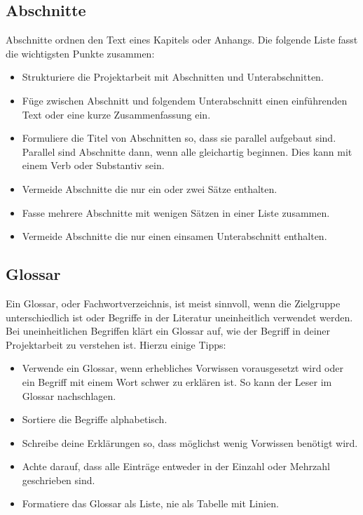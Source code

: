 \documentclass[a4paper,titlepage=true,twoside]{scrartcl}
\newcommand{\gquote}[1]{\glqq #1\grqq}
\begin{document}
\subsection{Abschnitte}
Abschnitte ordnen den Text eines Kapitels oder Anhangs. Die folgende Liste fasst
die wichtigsten Punkte zusammen:

\begin{itemize}
 \item Strukturiere die Projektarbeit mit Abschnitten und Unterabschnitten.
 \item Füge zwischen Abschnitt und folgendem Unterabschnitt einen einführenden
 Text oder eine kurze Zusammenfassung ein.
 \item Formuliere die Titel von Abschnitten so, dass sie \gquote{parallel} aufgebaut sind.
 Parallel sind Abschnitte dann, wenn alle gleichartig beginnen. Dies kann mit
  einem Verb oder Substantiv sein.
 \item Vermeide Abschnitte die nur ein oder zwei Sätze enthalten.
 \item Fasse mehrere Abschnitte mit wenigen Sätzen in einer Liste zusammen.
 \item Vermeide Abschnitte die nur einen einsamen Unterabschnitt enthalten.
\end{itemize}

\subsection{Glossar}
Ein Glossar, oder Fachwortverzeichnis, ist meist sinnvoll, wenn die Zielgruppe
unterschiedlich ist oder Begriffe in der Literatur uneinheitlich verwendet
werden. Bei uneinheitlichen Begriffen klärt ein Glossar auf, wie der Begriff
in deiner Projektarbeit zu verstehen ist. Hierzu einige Tipps:

\begin{itemize}
 \item Verwende ein Glossar, wenn erhebliches Vorwissen vorausgesetzt wird
oder ein Begriff mit einem Wort schwer zu erklären ist. So kann der Leser im
 Glossar nachschlagen.
 \item Sortiere die Begriffe alphabetisch.
 \item Schreibe deine Erklärungen so, dass möglichst wenig Vorwissen benötigt wird.
 \item Achte darauf, dass alle Einträge entweder in der Einzahl oder Mehrzahl
 geschrieben sind.
 \item Formatiere das Glossar als Liste, nie als Tabelle mit Linien.
\end{itemize}
\end{document}
